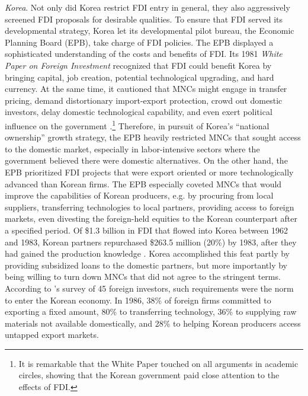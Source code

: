 \textit{Korea}. Not only did Korea restrict FDI entry in general, they also
aggressively screened FDI proposals for desirable qualities. To ensure that FDI
served its developmental strategy, Korea let its developmental pilot bureau, the
Economic Planning Board (EPB), take charge of FDI policies. The EPB displayed a
sophisticated understanding of the costs and benefits of FDI. Its 1981
\textit{White Paper on Foreign Investment} recognized that FDI could benefit
Korea by bringing capital, job creation, potential technological upgrading, and
hard currency. At the same time, it cautioned that MNCs might engage in transfer
pricing, demand distortionary import-export protection, crowd out domestic
investors, delay domestic technological capability, and even exert political
influence on the government \citep[50-64, quoted in
\citet{Chang2004}]{EPB1981}.\footnote{It is remarkable that the White Paper
  touched on all arguments in academic circles, showing that the Korean
  government paid close attention to the effects of FDI.} Therefore, in pursuit
of Korea's ``national ownership'' growth strategy, the EPB heavily restricted
MNCs that sought access to the domestic market, especially in labor-intensive
sectors where the government believed there were domestic alternatives. On the
other hand, the EPB prioritized FDI projects that were export oriented or more
technologically advanced than Korean firms. The EPB especially coveted MNCs that
would improve the capabilities of Korean producers, e.g. by procuring from local
suppliers, transferring technologies to local partners, providing access to
foreign markets, even divesting the foreign-held equities to the Korean
counterpart after a specified period. Of \$1.3 billion in FDI that
flowed into Korea between 1962 and 1983, Korean partners repurchased \$263.5
million (20\%) by 1983, after they had gained the production knowledge
\citep[135]{Mardon1990}. Korea accomplished this feat partly by providing
subsidized loans to the domestic partners, but more importantly by being willing
to turn down MNCs that did not agree to the stringent terms. According to
\citet{Mardon1990}'s survey of 45 foreign investors, such requirements were the
norm to enter the Korean economy. In 1986, 38\% of foreign firms committed to
exporting a fixed amount, 80\% to transferring technology, 36\% to supplying raw
materials not available domestically, and 28\% to helping Korean producers
access untapped export markets.

